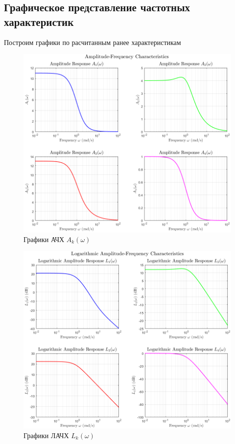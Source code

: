 \documentclass[a4paper, 12pt]{article}
\begin{document}
    \subsection{Графическое представление частотных характеристик}
    Построим графики по расчитанным ранее характеристикам
    \begin{figure}[H]
        \centering
        \includegraphics[scale=0.585]{1task_afr.png}
        \captionsetup{skip=0pt}
        \caption{Графики АЧХ $A_k(\omega)$}
        \label{fig:1task_afr}
    \end{figure}
    \begin{figure}[H]
        \centering
        \includegraphics[scale=0.585]{1task_lafr.png}
        \captionsetup{skip=0pt}
        \caption{Графики ЛАЧХ $L_k(\omega)$}
        \label{fig:1task_lafr}
    \end{figure}
\end{document}
